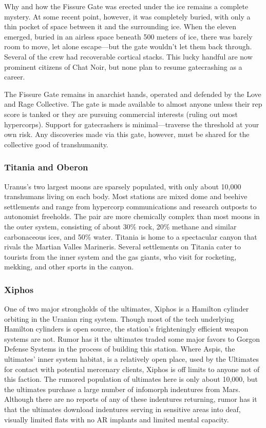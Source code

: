 Why and how the Fissure Gate was erected under the ice remains a complete mystery. At some recent point, however, it was completely buried, with only a thin pocket of space between it and the surrounding ice. When the eleven emerged, buried in an airless space beneath 500 meters of ice, there was barely room to move, let alone escape—but the gate wouldn't let them back through. Several of the crew had recoverable cortical stacks. This lucky handful are now prominent citizens of Chat Noir, but none plan to resume gatecrashing as a career. 

The Fissure Gate remains in anarchist hands, operated and defended by the Love and Rage Collective. The gate is made available to almost anyone unless their rep score is tanked or they are pursuing commercial interests (ruling out most hypercorps). Support for gatecrashers is minimal—traverse the threshold at your own risk. Any discoveries made via this gate, however, must be shared for the collective good of transhumanity. 

\subsubsection{Titania and Oberon}
\label{sec:titania-oberon} 

Uranus's two largest moons are sparsely populated, with only about 10,000 transhumans living on each body. Most stations are mixed dome and beehive settlements and range from hypercorp communications and research outposts to autonomist freeholds. The pair are more chemically complex than most moons in the outer system, consisting of about 30\% rock, 20\% methane and similar carbonaceous ices, and 50\% water. Titania is home to a spectacular canyon that rivals the Martian Valles Marineris. Several settlements on Titania cater to tourists from the inner system and the gas giants, who visit for rocketing, mekking, and other sports in the canyon. 

\subsubsection{Xiphos}
\label{sec:xiphos} 

One of two major strongholds of the ultimates, Xiphos is a Hamilton cylinder orbiting in the Uranian ring system. Though most of the tech underlying Hamilton cylinders is open source, the station's frighteningly efficient weapon systems are not. Rumor has it the ultimates traded some major favors to Gorgon Defense Systems in the process of building this station. Where Aspis, the ultimates' inner system habitat, is a relatively open place, used by the Ultimates for contact with potential mercenary clients, Xiphos is off limits to anyone not of this faction. The rumored population of ultimates here is only about 10,000, but the ultimates purchase a large number of infomorph indentures from Mars. Although there are no reports of any of these indentures returning, rumor has it that the ultimates download indentures serving in sensitive areas into deaf, visually limited flats with no AR implants and limited mental capacity. 

